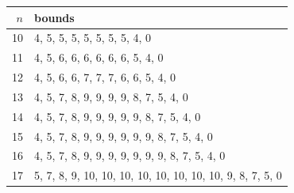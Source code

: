 \begin{tabular}{r|l}
$n$ & bounds \\ \hline
10 & 4, 5, 5, 5, 5, 5, 5, 5, 4, 0 \\
11 & 4, 5, 6, 6, 6, 6, 6, 6, 5, 4, 0 \\
12 & 4, 5, 6, 6, 7, 7, 7, 6, 6, 5, 4, 0 \\
13 & 4, 5, 7, 8, 9, 9, 9, 9, 8, 7, 5, 4, 0 \\
14 & 4, 5, 7, 8, 9, 9, 9, 9, 9, 8, 7, 5, 4, 0 \\
15 & 4, 5, 7, 8, 9, 9, 9, 9, 9, 9, 8, 7, 5, 4, 0 \\
16 & 4, 5, 7, 8, 9, 9, 9, 9, 9, 9, 9, 8, 7, 5, 4, 0 \\
17 & 5, 7, 8, 9, 10, 10, 10, 10, 10, 10, 10, 10, 9, 8, 7, 5, 0 \\
\end{tabular}
